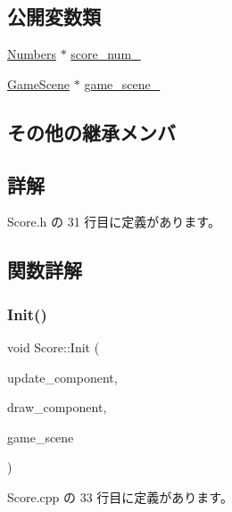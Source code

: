 \subsection*{公開変数類}
\begin{DoxyCompactItemize}
\item 
\mbox{\hyperlink{class_numbers}{Numbers}} $\ast$ \mbox{\hyperlink{class_score_a5d178c5581627f1fa4c06f95f9558dcd}{score\+\_\+num\+\_\+}}
\item 
\mbox{\hyperlink{class_game_scene}{Game\+Scene}} $\ast$ \mbox{\hyperlink{class_score_ada5a957b01fbed0c1bb52cea4e1bcbc4}{game\+\_\+scene\+\_\+}}
\end{DoxyCompactItemize}
\subsection*{その他の継承メンバ}


\subsection{詳解}


 Score.\+h の 31 行目に定義があります。



\subsection{関数詳解}
\mbox{\label{class_score_a7d461a8b72ddfd00213858286d702486}} 
\subsubsection{\texorpdfstring{Init()}{Init()}}
{\footnotesize\ttfamily void Score\+::\+Init (\begin{DoxyParamCaption}\item[{\mbox{\hyperlink{class_update_base}{Update\+Base}} $\ast$}]{update\+\_\+component,  }\item[{\mbox{\hyperlink{class_draw_base}{Draw\+Base}} $\ast$}]{draw\+\_\+component,  }\item[{\mbox{\hyperlink{class_game_scene}{Game\+Scene}} $\ast$}]{game\+\_\+scene }\end{DoxyParamCaption})}



 Score.\+cpp の 33 行目に定義があります。

\mbox{\label{class_score_ad01d461a2b6ca345858b2ae0a3d81cc1}} 
